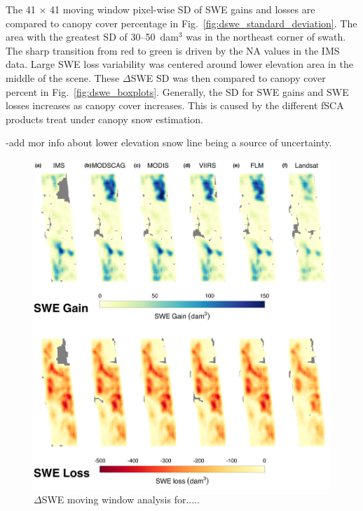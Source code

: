 The 41 $\times$ 41 moving window pixel-wise SD of SWE gains and losses are compared to canopy cover percentage in Fig.~\ref{fig:dswe_standard_deviation}. The area with the greatest SD of 30--50~dam$^{3}$ was in the northeast corner of swath. The sharp transition from red to green is driven by the NA values in the IMS data. Large SWE loss variability was centered around lower elevation area in the middle of the scene. These $\Delta$SWE SD was then compared to canopy cover percent in Fig.~\ref{fig:dswe_boxplots}. Generally, the SD for SWE gains and SWE losses increases as canopy cover increases. This is caused by the different fSCA products treat under canopy snow estimation.

-add mor info about lower elevation snow line being a source of uncertainty. 

\clearpage
\begin{figure}[h]
\centering
\includegraphics[width=\textwidth]{figures/ch4_figs/dswe_mw_full_dam3_v1.png}
\caption{$\Delta$SWE moving window analysis for.....}
\label{fig:dswe_moving_window}
\end{figure}




